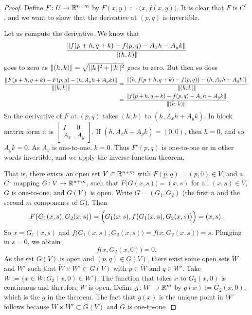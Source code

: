 \begin{proof}
Define $F \colon U \to {\mathbb{R}}^{n+m}$ by $F(x,y) := \bigl(x,f(x,y)\bigr)$.
It is clear that $F$ is $C^1$, and we want to show that the derivative
at $(p,q)$ is invertible.

Let us compute the derivative.  We know that
\begin{equation*}
\frac{\lVert {f(p+h,q+k) - f(p,q) - A_x h - A_y k} \rVert}{\lVert {(h,k)} \rVert}
\end{equation*}
goes to zero as $\lVert {(h,k)} \rVert = \sqrt{\lVert {h} \rVert^2+\lVert {k} \rVert^2}$ goes to zero.
But then so does
\begin{equation*}
\begin{split}
\frac{\lVert {F(p+h,q+k)-F(p,q) - (h,A_x h+A_y k)} \rVert}{\lVert {(h,k)} \rVert}
& =
\frac{\lVert {\bigl(h,f(p+h,q+k)-f(p,q)\bigr) - (h,A_x h+A_y
k)} \rVert}{\lVert {(h,k)} \rVert}
\\
& =
\frac{\lVert {f(p+h,q+k) - f(p,q) - A_x h - A_y k} \rVert}{\lVert {(h,k)} \rVert} .
\end{split}
\end{equation*}
So the derivative of $F$ at $(p,q)$ takes $(h,k)$ to $(h,A_x h+A_y k)$.
In block matrix form it is
$\left[\begin{smallmatrix}I & 0\\A_x & A_y\end{smallmatrix}\right]$.  If 
$(h,A_x h+A_y k) = (0,0)$, then $h=0$, and so $A_y k = 0$.  As $A_y$ is
one-to-one, $k=0$.  Thus $F'(p,q)$ is one-to-one or in other
words invertible, and we apply the inverse function theorem.

That is, there exists an open set $V \subset {\mathbb{R}}^{n+m}$ with
$F(p,q) = (p,0) \in V$,
and a  $C^1$
mapping $G \colon V \to {\mathbb{R}}^{n+m}$, such that $F\bigl(G(x,s)\bigr) = (x,s)$ for
all $(x,s) \in V$, $G$ is one-to-one, and $G(V)$ is open. %
Write $G = (G_1,G_2)$ (the first $n$ and the second $m$ components of $G$).
Then
\begin{equation*}
F\bigl(G_1(x,s),G_2(x,s)\bigr) = \Bigl(G_1(x,s),f\bigl(G_1(x,s),G_2(x,s) \bigr)\Bigr)
= (x,s) .
\end{equation*}
So $x = G_1(x,s)$ and $f\bigl(G_1(x,s),G_2(x,s)\bigr) = f\bigl(x,G_2(x,s)\bigr) = s$.
Plugging in $s=0$, we obtain
\begin{equation*}
f\bigl(x,G_2(x,0)\bigr) = 0 .
\end{equation*}
As the set $G(V)$ is open and $(p,q) \in G(V)$,
there exist some open sets
$\widetilde{W}$ and $W'$ such that $\widetilde{W} \times W' \subset G(V)$ with $p
\in \widetilde{W}$ and
$q \in W'$.
Take $W := \bigl\{ x \in \widetilde{W} : G_2(x,0) \in W' \bigr\}$.
The function that takes $x$ to $G_2(x,0)$ is continuous and therefore $W$
is open.
Define
$g \colon W \to {\mathbb{R}}^m$ by $g(x) := G_2(x,0)$, which is the $g$ in the theorem.
The fact that $g(x)$ is the unique point in $W'$ follows because $W \times
W' \subset G(V)$ and $G$ is one-to-one.


\end{proof}
